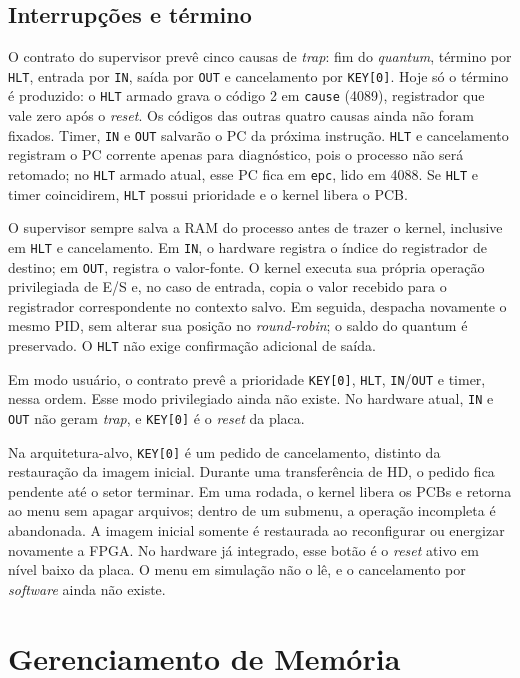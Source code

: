 \documentclass[
    12pt,
    openright,
    a4paper,
    english,
    brazilian
]{abntex2}
\begin{document}
\subsection{Interrupções e término}

O contrato do supervisor prevê cinco causas de \emph{trap}: fim do \emph{quantum}, término por \texttt{HLT}, entrada por \texttt{IN}, saída por \texttt{OUT} e cancelamento por \texttt{KEY[0]}. Hoje só o término é produzido: o \texttt{HLT} armado grava o código 2 em \texttt{cause} (4089), registrador que vale zero após o \emph{reset}. Os códigos das outras quatro causas ainda não foram fixados. Timer, \texttt{IN} e \texttt{OUT} salvarão o PC da próxima instrução. \texttt{HLT} e cancelamento registram o PC corrente apenas para diagnóstico, pois o processo não será retomado; no \texttt{HLT} armado atual, esse PC fica em \texttt{epc}, lido em 4088. Se \texttt{HLT} e timer coincidirem, \texttt{HLT} possui prioridade e o kernel libera o PCB.

O supervisor sempre salva a RAM do processo antes de trazer o kernel, inclusive em \texttt{HLT} e cancelamento. Em \texttt{IN}, o hardware registra o índice do registrador de destino; em \texttt{OUT}, registra o valor-fonte. O kernel executa sua própria operação privilegiada de E/S e, no caso de entrada, copia o valor recebido para o registrador correspondente no contexto salvo. Em seguida, despacha novamente o mesmo PID, sem alterar sua posição no \emph{round-robin}; o saldo do quantum é preservado. O \texttt{HLT} não exige confirmação adicional de saída.

Em modo usuário, o contrato prevê a prioridade \texttt{KEY[0]}, \texttt{HLT}, \texttt{IN}/\texttt{OUT} e timer, nessa ordem. Esse modo privilegiado ainda não existe. No hardware atual, \texttt{IN} e \texttt{OUT} não geram \emph{trap}, e \texttt{KEY[0]} é o \emph{reset} da placa.

Na arquitetura-alvo, \texttt{KEY[0]} é um pedido de cancelamento, distinto da restauração da imagem inicial. Durante uma transferência de HD, o pedido fica pendente até o setor terminar. Em uma rodada, o kernel libera os PCBs e retorna ao menu sem apagar arquivos; dentro de um submenu, a operação incompleta é abandonada. A imagem inicial somente é restaurada ao reconfigurar ou energizar novamente a FPGA. No hardware já integrado, esse botão é o \emph{reset} ativo em nível baixo da placa. O menu em simulação não o lê, e o cancelamento por \emph{software} ainda não existe.

\section{Gerenciamento de Memória}
\end{document}
